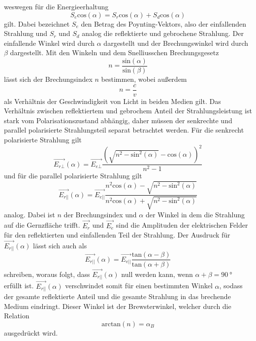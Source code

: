 weswegen für die Energieerhaltung
\begin{equation*}
    S_e \text{cos}(\alpha) = S_r \text{cos}(\alpha) + S_d \text{cos}(\alpha)
\end{equation*}
gilt. Dabei bezeichnet $S_e$ den Betrag des Poynting-Vektors, also der einfallenden Strahlung und $S_r$ 
und $S_d$ analog die reflektierte und gebrochene Strahlung. Der einfallende Winkel wird durch 
$\alpha$ dargestellt und der Brechungswinkel wird durch $\beta$ dargestellt.
Mit den Winkeln und dem Snelliusschen Brechungsgesetz
\begin{equation*}
    n = \frac{\text{sin}(\alpha)}{\text{sin}(\beta)}
    \label{eqn:snellius}
\end{equation*}
lässt sich der Brechungsindex $n$ bestimmen, wobei außerdem 
\begin{equation}
    n = \frac{c}{v}
    \label{eqn:verhältnis}
\end{equation}
als Verhältnis der Geschwindigkeit von Licht in beiden Medien gilt.
Das Verhältnis zwischen reflektiertem und gebrochem Anteil der Strahlungsleistung ist
stark vom Polarisationszustand abhängig, daher müssen der senkrechte und parallel polarisierte
Strahlungsteil separat betrachtet werden. 
Für die senkrecht polarisierte Strahlung gilt
\begin{equation}
    \vec{E_{r\bot}}(\alpha) = \vec{E_{e\bot}} \frac{(\sqrt{n^2 - \text{sin}^2(\alpha)} - \text{cos}(\alpha))^2}{n^2 - 1}
    \label{eqn:senkrecht}
\end{equation}
und für die parallel polarisierte Strahlung gilt 
\begin{equation}
    \vec{E_{r||}}(\alpha) = \vec{E_{e||}} \frac{n^2 \text{cos}(\alpha) - \sqrt{n^2 - \text{sin}^2(\alpha)}}{n^2 \text{cos}(\alpha) + \sqrt{n^2 - \text{sin}^2(\alpha)}}
    \label{eqn:parallel}
\end{equation}
analog. Dabei ist $n$ der Brechungsindex und $\alpha$ der Winkel in dem die Strahlung auf die Gernzfläche trifft.
$\vec{E_r}$ und $\vec{E_e}$ sind die Amplituden der elektrischen Felder für den reflektierten und einfallenden Teil der 
Strahlung. Der Ausdruck für $\vec{E_{r||}}(\alpha)$ lässt sich auch als 
\begin{equation}
    \vec{E_{r||}}(\alpha) = \vec{E_{e||}}\frac{\text{tan}(\alpha - \beta)}{\text{tan}(\alpha + \beta)}
\end{equation}
schreiben, woraus folgt, dass $\vec{E_{r||}}(\alpha)$ null werden kann, wenn $\alpha + \beta = \qty{90}{\degree}$
erfüllt ist. $\vec{E_{r||}}(\alpha)$ verschwindet somit für einen bestimmten Winkel $\alpha$, sodass der gesamte reflektierte Anteil
und die gesamte Strahlung in das brechende Medium eindringt. Dieser Winkel ist der Brewsterwinkel, welcher durch die Relation
\begin{equation}
    \text{arctan}(n) =\alpha_B \label{eqn:brewster}
\end{equation}
ausgedrückt wird.